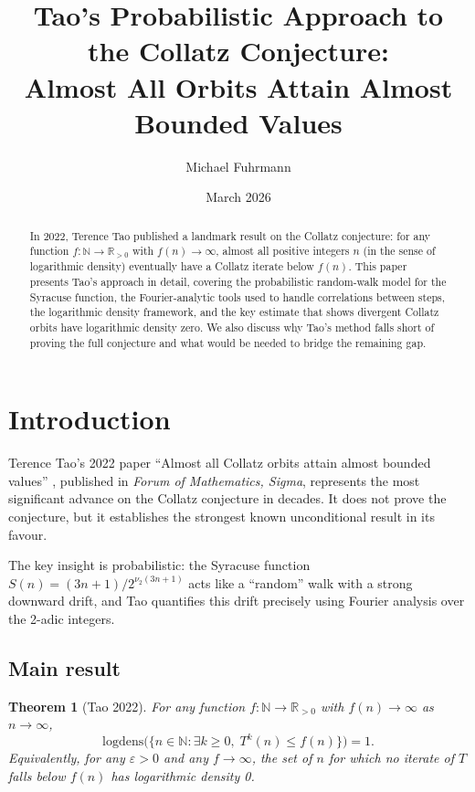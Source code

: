 \documentclass[12pt,a4paper]{article}
\newtheorem{theorem}{Theorem}[section]
\begin{document}
\title{Tao's Probabilistic Approach to the Collatz Conjecture:\\
Almost All Orbits Attain Almost Bounded Values}
\author{Michael Fuhrmann}
\date{March 2026}
\maketitle

\begin{abstract}
In 2022, Terence Tao published a landmark result on the Collatz conjecture:
for any function $f\colon \mathbb{N} \to \mathbb{R}_{>0}$ with $f(n) \to \infty$,
almost all positive integers $n$ (in the sense of logarithmic density) eventually
have a Collatz iterate below $f(n)$. This paper presents Tao's approach in detail,
covering the probabilistic random-walk model for the Syracuse function, the Fourier-analytic
tools used to handle correlations between steps, the logarithmic density framework, and
the key estimate that shows divergent Collatz orbits have logarithmic density zero.
We also discuss why Tao's method falls short of proving the full conjecture and what
would be needed to bridge the remaining gap.
\end{abstract}

\tableofcontents

\newpage

\section{Introduction}

Terence Tao's 2022 paper ``Almost all Collatz orbits attain almost bounded values''
\cite{Tao2022}, published in \emph{Forum of Mathematics, Sigma}, represents the most
significant advance on the Collatz conjecture in decades. It does not prove the conjecture,
but it establishes the strongest known unconditional result in its favour.

The key insight is probabilistic: the Syracuse function $S(n) = (3n+1)/2^{\nu_2(3n+1)}$
acts like a ``random'' walk with a strong downward drift, and Tao quantifies this drift
precisely using Fourier analysis over the 2-adic integers.

\subsection{Main result}

\begin{theorem}[Tao 2022]\label{thm:tao_main}
For any function $f\colon \mathbb{N} \to \mathbb{R}_{>0}$ with $f(n) \to \infty$ as $n \to \infty$,
\[
  \mathrm{logdens}\bigl(\{ n \in \mathbb{N} : \exists k \geq 0,\; T^k(n) \leq f(n) \}\bigr) = 1.
\]
Equivalently, for any $\varepsilon > 0$ and any $f \to \infty$, the set of $n$ for which
no iterate of $T$ falls below $f(n)$ has logarithmic density 0.
\end{theorem}
\end{document}

